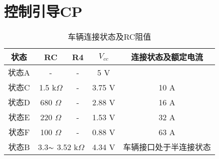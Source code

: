 \chapter{控制引导CP}


\begin{table}[H]
    \renewcommand{\arraystretch}{1.3}
    \centering
    \caption{车辆连接状态及RC阻值}
    \begin{tabular}{ccccc}   
        \toprule
        状态  & RC  & R4 & $V_{cc}$ & 连接状态及额定电流\\    
        \midrule
        状态A  & -  & - & 5 V &   \\
        状态C  & 1.5 k$\Omega$  & - & 3.75 V &  10 A \\
        状态D  & 680 $\Omega$  & - &  2.88 V &  16 A  \\
        状态E  & 220 $\Omega$ & - &   1.53 V &  32 A  \\
        状态F  & 100 $\Omega$ & - &   0.88 V &  63 A  \\
        状态B  & \multicolumn{2}{c}{3.3$\thicksim$ 3.52 k$\Omega$} & 4.34 V &车辆接口处于半连接状态\\
        \bottomrule
    \end{tabular}
    \label{tab:RC2}
\end{table}


